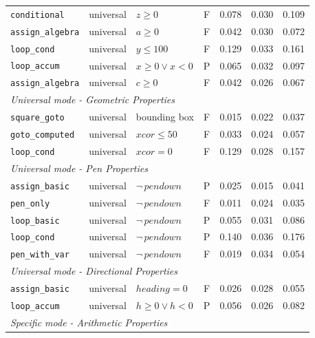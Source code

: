 \begin{longtable}{p{} p{} p{} c r r r}
\texttt{conditional}     & universal & $z \geq 0$                       & F & 0.078 & 0.030 & 0.109 \\
\texttt{assign\_algebra} & universal & $a \geq 0$                       & F & 0.042 & 0.030 & 0.072 \\
\texttt{loop\_cond}      & universal & $y \leq 100$                     & F & 0.129 & 0.033 & 0.161 \\
\texttt{loop\_accum}     & universal & $x{\geq}0\vee x{<}0$           & P & 0.065 & 0.032 & 0.097 \\
\texttt{assign\_algebra} & universal & $c \geq 0$                       & F & 0.042 & 0.026 & 0.067 \\
\midrule
\multicolumn{7}{l}{\textit{Universal mode - Geometric Properties}} \\
\midrule
\texttt{square\_goto}    & universal & bounding box                     & F & 0.015 & 0.022 & 0.037 \\
\texttt{goto\_computed}  & universal & $\mathit{xcor}\leq 50$          & F & 0.033 & 0.024 & 0.057 \\
\texttt{loop\_cond}      & universal & $\mathit{xcor}=0$               & F & 0.129 & 0.028 & 0.157 \\
\midrule
\multicolumn{7}{l}{\textit{Universal mode - Pen Properties}} \\
\midrule
\texttt{assign\_basic}   & universal & $\neg\,\mathit{pendown}$        & P & 0.025 & 0.015 & 0.041 \\
\texttt{pen\_only}       & universal & $\neg\,\mathit{pendown}$        & F & 0.011 & 0.024 & 0.035 \\
\texttt{loop\_basic}     & universal & $\neg\,\mathit{pendown}$        & P & 0.055 & 0.031 & 0.086 \\
\texttt{loop\_cond}      & universal & $\neg\,\mathit{pendown}$        & P & 0.140 & 0.036 & 0.176 \\
\texttt{pen\_with\_var}  & universal & $\neg\,\mathit{pendown}$        & F & 0.019 & 0.034 & 0.054 \\
\midrule
\multicolumn{7}{l}{\textit{Universal mode - Directional Properties}} \\
\midrule
\texttt{assign\_basic}   & universal & $\mathit{heading}=0$            & F & 0.026 & 0.028 & 0.055 \\
\texttt{loop\_accum}     & universal & $h{\geq}0\vee h{<}0$           & P & 0.056 & 0.026 & 0.082 \\
\midrule
\multicolumn{7}{l}{\textit{Specific mode - Arithmetic Properties}} \\

\end{longtable}
